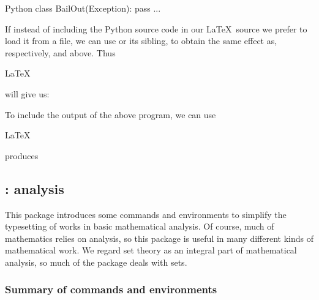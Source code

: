 {{\begin{snippet}{Python}
class BailOut(Exception):
    pass
...
\end{snippet}

If instead of including the Python source code in our \LaTeX~source we prefer to load it from a file, we can use  or its sibling,  to obtain the same effect as, respectively,  and  above. Thus
\begin{snippet}{LaTeX}
\end{snippet}
will give us:

To include the output of the above program, we can use
\begin{snippet}{LaTeX}
\end{snippet}
produces

\subsection{: analysis}

This package introduces some commands and environments to simplify the typesetting of works in basic mathematical analysis. Of course, much of mathematics relies on analysis, so this package is useful in many different kinds of mathematical work. We regard set theory as an integral part of mathematical analysis, so much of the package deals with sets.

\subsubsection{Summary of commands and environments}

}}
